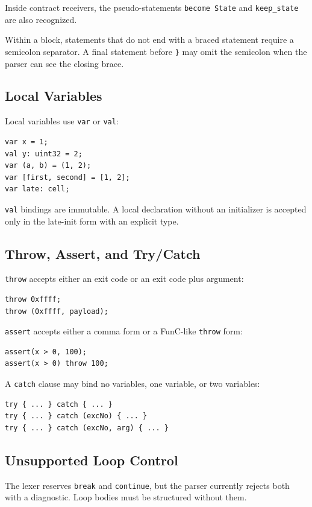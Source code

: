 \documentclass[12pt,oneside]{article}
\begin{document}
Inside contract receivers, the pseudo-statements \verb|become State| and
\verb|keep_state| are also recognized.

Within a block, statements that do not end with a braced statement require a
semicolon separator. A final statement before \verb|}| may omit the semicolon
when the parser can see the closing brace.

\subsection{Local Variables}
Local variables use \verb|var| or \verb|val|:

\begin{verbatim}
var x = 1;
val y: uint32 = 2;
var (a, b) = (1, 2);
var [first, second] = [1, 2];
var late: cell;
\end{verbatim}

\verb|val| bindings are immutable. A local declaration without an initializer
is accepted only in the late-init form with an explicit type.

\subsection{Throw, Assert, and Try/Catch}
\verb|throw| accepts either an exit code or an exit code plus argument:

\begin{verbatim}
throw 0xffff;
throw (0xffff, payload);
\end{verbatim}

\verb|assert| accepts either a comma form or a FunC-like \verb|throw| form:

\begin{verbatim}
assert(x > 0, 100);
assert(x > 0) throw 100;
\end{verbatim}

A \verb|catch| clause may bind no variables, one variable, or two variables:

\begin{verbatim}
try { ... } catch { ... }
try { ... } catch (excNo) { ... }
try { ... } catch (excNo, arg) { ... }
\end{verbatim}

\subsection{Unsupported Loop Control}
The lexer reserves \verb|break| and \verb|continue|, but the parser currently
rejects both with a diagnostic. Loop bodies must be structured without them.
\end{document}
